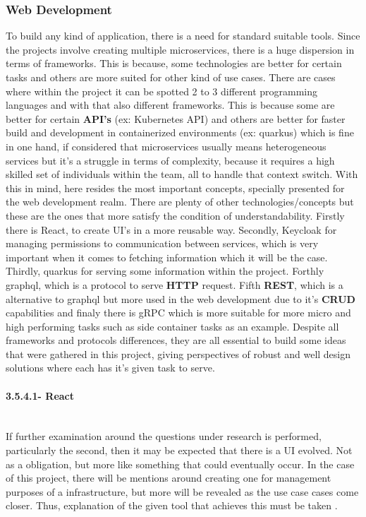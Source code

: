 \subsubsection{Web Development}
To build any kind of application, there is a need for standard suitable tools. Since the projects involve creating multiple microservices, there is a huge dispersion in terms of frameworks. This is because, some technologies are better for certain tasks and others are more suited for other kind of use cases. There are cases where within the project it can be spotted 2 to 3 different programming languages and with that also different frameworks. This is because some are better for certain \textbf{API's} (ex: Kubernetes API) and others are better for faster build and development in containerized environments (ex: quarkus) which is fine in one hand, if considered that microservices usually means heterogeneous services but it's a struggle in terms of complexity, because it requires a high skilled set of individuals within the team, all to handle that context switch.
    With this in mind, here resides the most important concepts, specially presented for the web development realm. There are plenty of other technologies/concepts but these are the ones that more satisfy the condition of understandability.  Firstly there is React, to create UI's in a more reusable way. Secondly, Keycloak for managing permissions to communication between services, which is very important when it comes to fetching information which it will be the case. Thirdly, quarkus for serving some information within the project. Forthly graphql, which is a protocol to serve \textbf{HTTP} request. Fifth \textbf{REST}, which is a alternative to graphql but more used in the web development due to it's \textbf{CRUD} capabilities and finaly there is gRPC which is more suitable for more micro and high performing tasks such as side container tasks as an example.
Despite all frameworks and protocols differences, they are all essential to build some ideas that were gathered in this project, giving perspectives of robust and well design solutions where each has it's given task to serve.

\paragraph{3.5.4.1- React}\mbox{}\\
If further examination around the questions under research is performed, particularly the second, then it may be expected that there is a UI evolved. Not as a obligation, but more like something that could eventually occur. In the case of this project, there will be mentions around creating one for management purposes of a infrastructure, but more will be revealed as the use case cases come closer. Thus, explanation of the given tool that achieves this must be taken \cite{react}.

